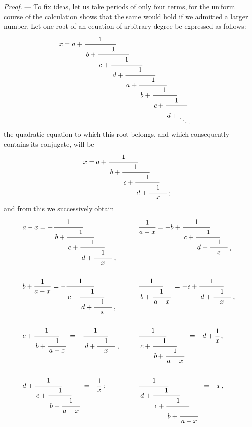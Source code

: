 \noindent\emph{Proof.} — To fix ideas, let us take periods of only four terms,
for the uniform course of the calculation shows that the same would hold if
we admitted a larger number. Let one root of an equation of arbitrary degree
be expressed as follows:
\[
x = a + \GalCfrac{1}{
      \,b + \GalHlap{$\cfrac{1}{
      \,c + \GalHlap{$\cfrac{1}{
      \,d + \GalHlap{$\cfrac{1}{
      \,a + \GalHlap{$\cfrac{1}{
      \,b + \GalHlap{$\cfrac{1}{
      \,c + \GalHlap{$\cfrac{1}{\GalStrut
      \,d + \raisebox{-2ex}{$\ddots$\rlap{\,;}} }$}}\;$}}\;$}}\;$}}\;$}}\;$}}\GalCfracCorrect
\]
the quadratic equation to which this root belongs, and which consequently
contains its conjugate, will be
\[
x = a + \GalCfrac{1}{
  \,b + \GalHlap{$\cfrac{1}{
  \,c + \GalHlap{$\cfrac{1}{
  \,d + \GalHlap{$\cfrac{1}{\quad x \quad } \;\rlap{;}$}}\;$}}\;$}}\GalCfracCorrect
\]
%
and from this we successively obtain
\begin{align*}
&a - x = - \GalCfrac{1}{
      \,b + \GalHlap{$\cfrac{1}{
      \,c + \GalHlap{$\cfrac{1}{
      \,d + \GalHlap{$\cfrac{1}{\quad x \quad } \;\rlap{,}$}}\;$}}\;$}}\GalCfracCorrect \qquad
&&\frac{1}{a-x} =
      - b + \GalCfrac{1}{
      \,c + \GalHlap{$\cfrac{1}{
      \,d + \GalHlap{$\cfrac{1}{\quad x \quad } \;\rlap{,}$}}\;$}}\GalCfracCorrect
\\[\baselineskip]
& b + \frac{1}{a-x} =
          - \GalCfrac{1}{
      \,c + \GalHlap{$\cfrac{1}{
      \,d + \GalHlap{$\cfrac{1}{\quad x \quad } \;\rlap{,}$}}\;$}}\GalCfracCorrect
&&\GalCfrac{1}{
      \,b + \GalHlap{$\cfrac{1}{
      \,a - x \, }\;$}}\GalCfracCorrect
=     - c + \GalCfrac{1}{
      \,d + \GalHlap{$\cfrac{1}{\quad x \quad } \;\rlap{,}$}}\GalCfracCorrect
\\[\baselineskip]
&c + \GalCfrac{1}{
      \,b + \GalHlap{$\cfrac{1}{
      \,a - x \, }\;$}}\GalCfracCorrect
=         - \GalCfrac{1}{
      \,d + \GalHlap{$\cfrac{1}{\quad x \quad } \;\rlap{,}$}}\GalCfracCorrect
&&\GalCfrac{1}{
      \,c + \GalHlap{$\cfrac{1}{
      \,b + \GalHlap{$\cfrac{1}{
      \,a - x \, }\;$}}\;$}}\GalCfracCorrect
=     -d + \frac{1}{x} \, ,
\\[\baselineskip]
&       d + \GalCfrac{1}{
      \,c + \GalHlap{$\cfrac{1}{
      \,b + \GalHlap{$\cfrac{1}{
      \,a - x \, }$}}\;$}}\GalCfracCorrect
=         - \frac{1}{x} \,;
&&\GalCfrac{1}{
      \,d + \GalHlap{$\cfrac{1}{
      \,c + \GalHlap{$\cfrac{1}{
      \,b + \GalHlap{$\cfrac{1}{
      \,a - x \, }$}}\;$}}\;$}}\GalCfracCorrect
=     -x\, ,
\end{align*}
